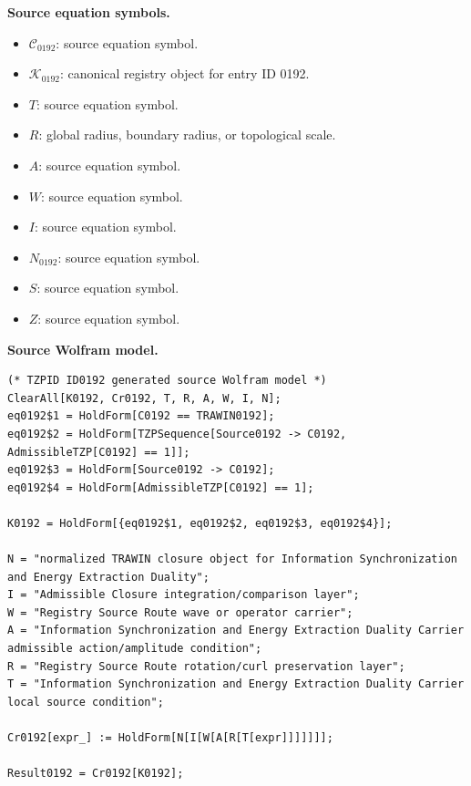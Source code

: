 \begin{minipage}[t]{0.49\linewidth}
\begingroup
\small
\raggedright
\textbf{Source equation symbols.}\par
\begin{itemize}[leftmargin=1.35em,itemsep=1pt,topsep=1pt,parsep=0pt]
    \item $\mathcal{C}_{0192}$: source equation symbol.
    \item $\mathcal{K}_{0192}$: canonical registry object for entry ID 0192.
    \item $T$: source equation symbol.
    \item $R$: global radius, boundary radius, or topological scale.
    \item $A$: source equation symbol.
    \item $W$: source equation symbol.
    \item $I$: source equation symbol.
    \item $N_{0192}$: source equation symbol.
    \item $S$: source equation symbol.
    \item $Z$: source equation symbol.
\end{itemize}
\endgroup
\end{minipage}\hfill
\begin{minipage}[t]{0.47\linewidth}
\begingroup
\scriptsize
\raggedright
\textbf{Source Wolfram model.}\par
\begin{Verbatim}[fontsize=\tiny,breaklines=true,breakanywhere=true]
(* TZPID ID0192 generated source Wolfram model *)
ClearAll[K0192, Cr0192, T, R, A, W, I, N];
eq0192$1 = HoldForm[C0192 == TRAWIN0192];
eq0192$2 = HoldForm[TZPSequence[Source0192 -> C0192, AdmissibleTZP[C0192] == 1]];
eq0192$3 = HoldForm[Source0192 -> C0192];
eq0192$4 = HoldForm[AdmissibleTZP[C0192] == 1];

K0192 = HoldForm[{eq0192$1, eq0192$2, eq0192$3, eq0192$4}];

N = "normalized TRAWIN closure object for Information Synchronization and Energy Extraction Duality";
I = "Admissible Closure integration/comparison layer";
W = "Registry Source Route wave or operator carrier";
A = "Information Synchronization and Energy Extraction Duality Carrier admissible action/amplitude condition";
R = "Registry Source Route rotation/curl preservation layer";
T = "Information Synchronization and Energy Extraction Duality Carrier local source condition";

Cr0192[expr_] := HoldForm[N[I[W[A[R[T[expr]]]]]]];

Result0192 = Cr0192[K0192];
\end{Verbatim}
\endgroup
\end{minipage}

